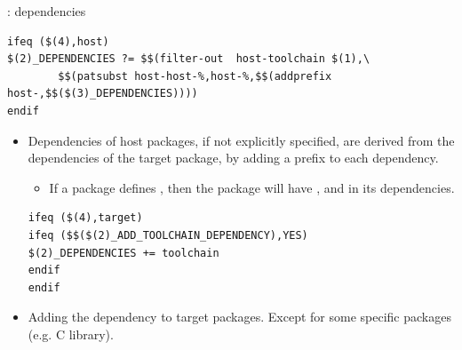 \begin{frame}[fragile]{: dependencies}

\begin{block}{}
\begin{verbatim}
ifeq ($(4),host)
$(2)_DEPENDENCIES ?= $$(filter-out  host-toolchain $(1),\
        $$(patsubst host-host-%,host-%,$$(addprefix host-,$$($(3)_DEPENDENCIES))))
endif
\end{verbatim}
\end{block}

\small
\begin{itemize}

\item Dependencies of host packages, if not explicitly specified, are
  derived from the dependencies of the target package, by adding a
  \code{host-} prefix to each dependency.

\begin{itemize}
\item If a package  defines
  , then the
   package will have ,  and
    \code{host-buzz} in its dependencies.
\end{itemize}

\begin{block}{}
\begin{verbatim}
ifeq ($(4),target)
ifeq ($$($(2)_ADD_TOOLCHAIN_DEPENDENCY),YES)
$(2)_DEPENDENCIES += toolchain
endif
endif
\end{verbatim}
\end{block}

\item Adding the  dependency to target
  packages. Except for some specific packages (e.g. C library).

\end{itemize}

\end{frame}

